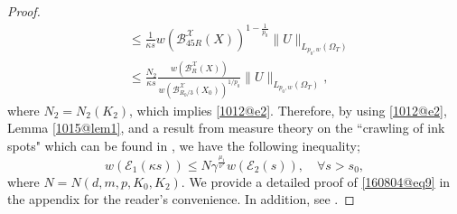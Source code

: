 \documentclass[reqno]{amsart}
\numberwithin{equation}{section}
\theoremstyle{plain}
\theoremstyle{definition}
\theoremstyle{remark}
\begin{document}
\begin{proof}
\begin{align*}
&\le \frac{1}{\kappa s}w({\mathcal{B}}_{45R}^{\mathcal{X}}(X))^{1-\frac{1}{p_0}}\|U\|_{L_{p_0,w}(\Omega_T)}\\
&\le \frac{N_2}{\kappa s}\frac{w({\mathcal{B}}_{R}^{\mathcal{X}}(X))}{w({\mathcal{B}}^{\mathcal{X}}_{R_0/3}(X_0))^{1/p_0}}\|U\|_{L_{p_0,w}(\Omega_T)},
\end{align*}
where $N_2=N_2(K_2)$, which implies \eqref{1012@e2}.
Therefore, by using \eqref{1012@e2}, Lemma \ref{1015@lem1}, and a result from measure theory on the ``crawling of ink spots" which can be found in \cite[Section 2]{MR563790}, we have the following inequality;
\begin{equation}		\label{160804@eq9}
w({\mathcal{E}}_1(\kappa s))\le N\gamma^{\frac{\mu_1}{\nu'}}w({\mathcal{E}}_2(s)), \quad \forall s>s_0,
\end{equation}
where $N=N(d,m,p,K_0,K_2)$.
We provide a detailed proof of \eqref{160804@eq9} in the appendix for the reader's convenience.
In addition, see \cite{MR3467697}.


\end{proof}
\end{document}
